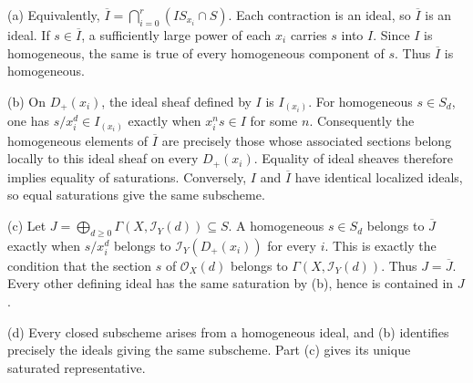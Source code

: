 (a) Equivalently, $\overline I=\bigcap_{i=0}^r(IS_{x_i}\cap S)$. Each contraction is an ideal, so $\overline I$ is an ideal. If $s\in\overline I$, a sufficiently large power of each $x_i$ carries $s$ into $I$. Since $I$ is homogeneous, the same is true of every homogeneous component of $s$. Thus $\overline I$ is homogeneous.

(b) On $D_+(x_i)$, the ideal sheaf defined by $I$ is $I_{(x_i)}$. For homogeneous $s\in S_d$, one has $s/x_i^d\in I_{(x_i)}$ exactly when $x_i^ns\in I$ for some $n$. Consequently the homogeneous elements of $\overline I$ are precisely those whose associated sections belong locally to this ideal sheaf on every $D_+(x_i)$. Equality of ideal sheaves therefore implies equality of saturations. Conversely, $I$ and $\overline I$ have identical localized ideals, so equal saturations give the same subscheme.

(c) Let $J=\bigoplus_{d\ge0}\Gamma(X,\mathcal I_Y(d))\subseteq S$. A homogeneous $s\in S_d$ belongs to $\overline J$ exactly when $s/x_i^d$ belongs to $\mathcal I_Y(D_+(x_i))$ for every $i$. This is exactly the condition that the section $s$ of $\mathcal O_X(d)$ belongs to $\Gamma(X,\mathcal I_Y(d))$. Thus $J=\overline J$. Every other defining ideal has the same saturation by (b), hence is contained in $J$.

(d) Every closed subscheme arises from a homogeneous ideal, and (b) identifies precisely the ideals giving the same subscheme. Part (c) gives its unique saturated representative.
